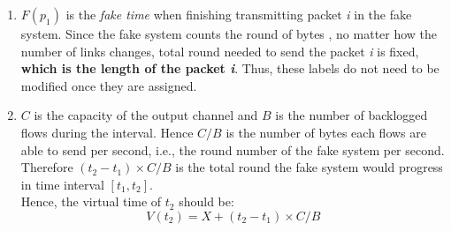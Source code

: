 \documentclass[12pt,titlepage,letterpaper]{article}
\begin{document}
\begin{enumerate}
    \item $F(p_1)$ is the \emph{fake time} when finishing transmitting packet
        \emph{i} in the fake system. Since the fake system counts the round of
        bytes , no matter how the number of links changes, total round needed
        to send the packet \emph{i} is fixed, \textbf{which is the length of
        the packet \emph{i}}. Thus, these labels do not need to be modified
        once they are assigned.
    \item $C$ is the capacity of the output channel and $B$ is the number of
        backlogged flows during the interval. Hence $C/B$ is the number of
        bytes each flows are able to send per second, i.e., the round number of
        the fake system per second.\\
        Therefore $(t_2-t_1) \times C / B$ is the total round the fake system
        would progress in time interval $[t_1, t_2]$.\\
        Hence, the virtual time of $t_2$ should be:
        \[V(t_2) = X + (t_2 - t_1) \times C / B\]
\end{enumerate}
\end{document}
